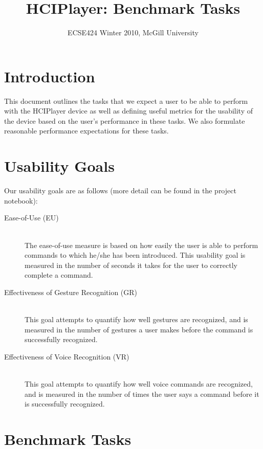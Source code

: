 \documentclass[12pt,letterpaper]{article}
\begin{document}
\title{HCIPlayer: Benchmark Tasks}
\author{ECSE424 Winter 2010, McGill University}
\renewcommand{\today}{Updated: Monday, March 8th, 2010}
\maketitle

\section{Introduction}
This document outlines the tasks that we expect a user to be able to perform with the HCIPlayer device as well as defining useful metrics for the usability of the device based on the user's performance in these tasks. We also formulate reasonable performance expectations for these tasks.

\section{Usability Goals}

Our usability goals are as follows (more detail can be found in the project notebook):

\begin{description}
\item[Ease-of-Use (EU)] \hfill \\
The ease-of-use measure is based on how easily the user is able to perform commands to which he/she has been introduced. This usability goal is measured in the number of seconds it takes for the user to correctly complete a command.
\item[Effectiveness of Gesture Recognition (GR)] \hfill \\
This goal attempts to quantify how well gestures are recognized, and is measured in the number of gestures a user makes before the command is successfully recognized.
\item[Effectiveness of Voice Recognition (VR)] \hfill \\
This goal attempts to quantify how well voice commands are recognized, and is measured in the number of times the user says a command before it is successfully recognized.
\end{description}

\section{Benchmark Tasks}
\end{document}
